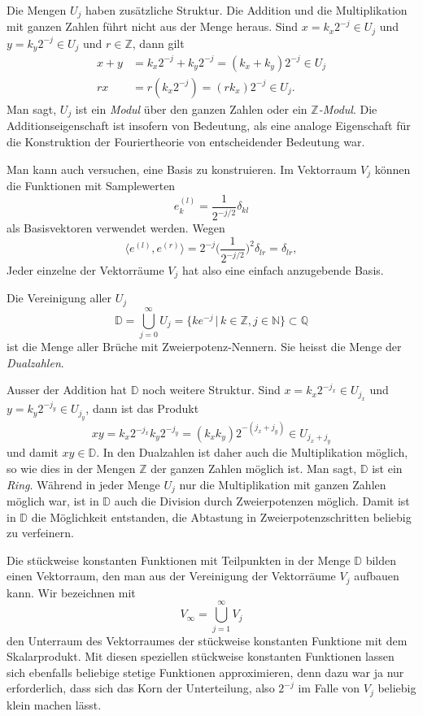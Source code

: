 Die Mengen $U_j$ haben zusätzliche Struktur.
Die Addition und die Multiplikation mit ganzen Zahlen führt nicht aus
der Menge heraus.
Sind $x=k_x2^{-j}\in U_j$ und $y=k_y2^{-j}\in U_j$ und $r\in\mathbb Z$,
dann gilt
\begin{align*}
x+y &= k_x 2^{-j}+k_y2^{-j}=(k_x+k_y)2^{-j}\in U_j
\\
rx&=r(k_x2^{-j}) = (rk_x)2^{-j}\in U_j.
\end{align*}
Man sagt, $U_j$ ist ein {\em Modul} über den ganzen Zahlen oder ein
{\em $\mathbb Z$-Modul}.
Die Additionseigenschaft ist insofern von Bedeutung, als eine analoge
Eigenschaft für die Konstruktion der Fouriertheorie von entscheidender
Bedeutung war.

Man kann auch versuchen, eine Basis zu konstruieren.
Im Vektorraum $V_j$ können die Funktionen mit Samplewerten
\[
e^{(l)}_k = \frac{1}{2^{-j/2}}\delta_{kl}
\]
als Basisvektoren verwendet werden.
Wegen
\[
\langle e^{(l)},e^{(r)}\rangle
=
2^{-j}
\biggl(
\frac{1}{2^{-j/2}}
\biggr)^2\delta_{lr}
=
\delta_{lr},
\]
Jeder einzelne der Vektorräume $V_j$ hat also eine einfach anzugebende
Basis.

Die Vereinigung aller $U_j$ 
\[
\mathbb D
=
\bigcup_{j=0}^\infty U_j
=
\{ ke^{-j}\,|\, k\in\mathbb Z, j\in\mathbb N\}
\subset
\mathbb Q
\]
ist die Menge aller Brüche mit Zweierpotenz-Nennern.
Sie heisst die Menge der {\em Dualzahlen}.


Ausser der Addition hat 
$\mathbb D$ noch weitere Struktur.
Sind $x = k_x2^{-j_x}\in U_{j_x}$ und $y=k_y2^{-j_y}\in U_{j_y}$, dann
ist das Produkt
\[
xy = k_x2^{-j_x} k_y2^{-j_y}=(k_xk_y)2^{-(j_x+j_y)}\in U_{j_x+j_y}
\]
und damit $xy\in\mathbb D$.
In den Dualzahlen ist daher auch die Multiplikation möglich, so wie
dies in der Mengen $\mathbb Z$ der ganzen Zahlen möglich ist.
Man sagt, $\mathbb D$ ist ein {\em Ring}.
%
Während in jeder Menge $U_j$ nur die Multiplikation mit ganzen Zahlen
möglich war, ist in $\mathbb D$ auch die Division durch Zweierpotenzen
möglich.
Damit ist in $\mathbb D$ die Möglichkeit entstanden, die Abtastung
in Zweierpotenzschritten beliebig zu verfeinern.

Die stückweise konstanten Funktionen mit Teilpunkten in der Menge
$\mathbb D$ bilden einen Vektorraum, den man aus der Vereinigung
der Vektorräume $V_j$ aufbauen kann.
Wir bezeichnen mit
\[
V_\infty = \bigcup_{j=1}^\infty V_j 
\]
den Unterraum des Vektorraumes der stückweise konstanten Funktione mit
dem Skalarprodukt.
Mit diesen speziellen stückweise konstanten Funktionen lassen sich ebenfalls
beliebige stetige Funktionen approximieren, denn dazu war ja nur 
erforderlich, dass sich das Korn der Unterteilung, also $2^{-j}$ im Falle
von $V_j$ beliebig klein machen lässt.

